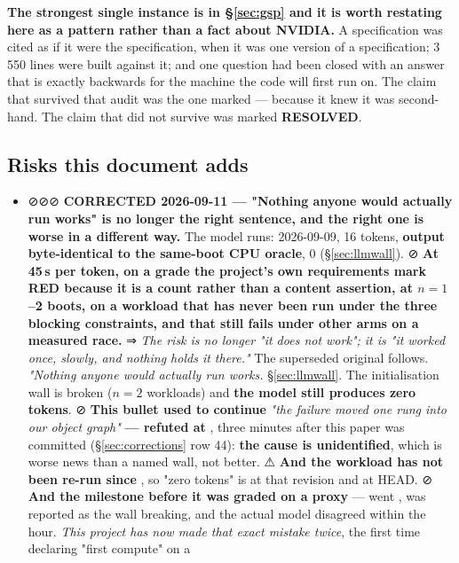 \documentclass[10.5pt]{article}
\begin{document}
\textbf{The strongest single instance is in \S\ref{sec:gsp} and it is worth restating here as a
pattern rather than a fact about NVIDIA.} A specification was cited as if it were the
specification, when it was one version of a specification; 3\,550 lines were built against it; and
one question had been closed with an answer that is exactly backwards for the machine the code will
first run on. The claim that survived that audit was the one marked \code{[inferred]} — because it
knew it was second-hand. The claim that did not survive was marked \textbf{RESOLVED}.

\subsection{Risks this document adds}
\label{sec:risks}

\begin{itemize}
\item ⊘⊘⊘ \textbf{CORRECTED 2026-09-11 --- "Nothing anyone would actually run works" is no
  longer the right sentence, and the right one is worse in a different way.} The model runs:
  \measured{} 2026-09-09, 16 tokens, \textbf{output byte-identical to the same-boot CPU oracle},
  0  (\S\ref{sec:llmwall}). ⊘ \textbf{At 45\,s per token, on a grade the project's own
  requirements mark RED because it is a count rather than a content assertion, at $n = 1$--2
  boots, on a workload that has never been run under the three blocking constraints, and that
  still fails under other arms on a measured race.} ⇒ \emph{The risk is no longer "it does not
  work"; it is "it worked once, slowly, and nothing holds it there."} The superseded original
  follows. \emph{"Nothing anyone would actually run works.} \S\ref{sec:llmwall}. The
   initialisation wall is broken ($n = 2$ workloads) and \textbf{the model still
  produces zero tokens}. ⊘ \textbf{This bullet used to continue} \emph{"the failure moved one rung
  into our object graph"} \textbf{--- refuted at }, three minutes after this paper
  was committed (\S\ref{sec:corrections} row 44): \textbf{the cause is unidentified}, which is
  worse news than a named wall, not better. ⚠ \textbf{And the workload has not been re-run since
  }, so "zero tokens" is \measured{} at that revision and \unver{} at HEAD.
  ⊘ \textbf{And the
  milestone before it was graded on a proxy} —  went , was
  reported as the wall breaking, and the actual model disagreed within the hour. \emph{This
  project has now made that exact mistake twice}, the first time declaring "first compute" on a

\end{itemize}
\end{document}
